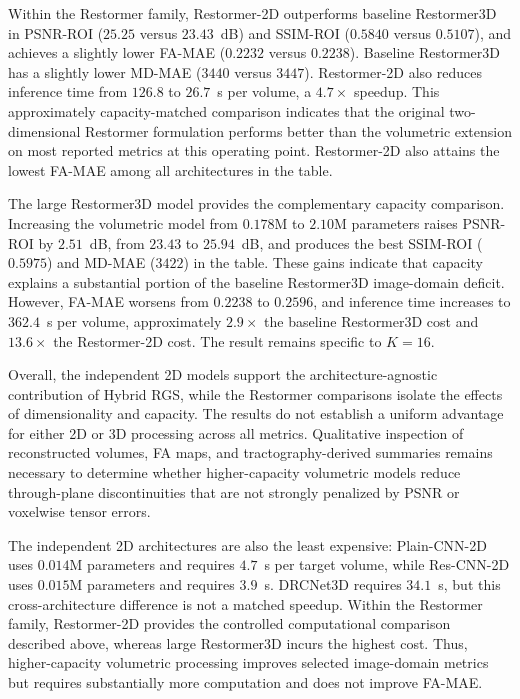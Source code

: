 \documentclass[preprint,12pt]{elsarticle}
\begin{document}
Within the Restormer family, Restormer-2D outperforms baseline Restormer3D in PSNR-ROI ($25.25$ versus $23.43$~dB) and SSIM-ROI ($0.5840$ versus $0.5107$), and achieves a slightly lower FA-MAE ($0.2232$ versus $0.2238$). Baseline Restormer3D has a slightly lower MD-MAE ($3440$ versus $3447$). Restormer-2D also reduces inference time from $126.8$ to $26.7$~s per volume, a $4.7\times$ speedup. This approximately capacity-matched comparison indicates that the original two-dimensional Restormer formulation performs better than the volumetric extension on most reported metrics at this operating point. Restormer-2D also attains the lowest FA-MAE among all architectures in the table.

The large Restormer3D model provides the complementary capacity comparison. Increasing the volumetric model from $0.178$M to $2.10$M parameters raises PSNR-ROI by $2.51$~dB, from $23.43$ to $25.94$~dB, and produces the best SSIM-ROI ($0.5975$) and MD-MAE ($3422$) in the table. These gains indicate that capacity explains a substantial portion of the baseline Restormer3D image-domain deficit. However, FA-MAE worsens from $0.2238$ to $0.2596$, and inference time increases to $362.4$~s per volume, approximately $2.9\times$ the baseline Restormer3D cost and $13.6\times$ the Restormer-2D cost. The result remains specific to $K=16$.

Overall, the independent 2D models support the architecture-agnostic contribution of Hybrid RGS, while the Restormer comparisons isolate the effects of dimensionality and capacity. The results do not establish a uniform advantage for either 2D or 3D processing across all metrics. Qualitative inspection of reconstructed volumes, FA maps, and tractography-derived summaries remains necessary to determine whether higher-capacity volumetric models reduce through-plane discontinuities that are not strongly penalized by PSNR or voxelwise tensor errors.

The independent 2D architectures are also the least expensive: Plain-CNN-2D uses $0.014$M parameters and requires $4.7$~s per target volume, while Res-CNN-2D uses $0.015$M parameters and requires $3.9$~s. DRCNet3D requires $34.1$~s, but this cross-architecture difference is not a matched speedup. Within the Restormer family, Restormer-2D provides the controlled computational comparison described above, whereas large Restormer3D incurs the highest cost. Thus, higher-capacity volumetric processing improves selected image-domain metrics but requires substantially more computation and does not improve FA-MAE.
\end{document}
